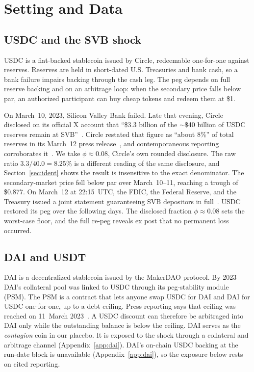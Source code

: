 \section{Setting and Data}
\label{sec:setting}

\subsection{USDC and the SVB shock}
USDC is a fiat-backed stablecoin issued by Circle, redeemable one-for-one against
reserves. Reserves are held in short-dated U.S. Treasuries and bank cash, so a bank
failure impairs backing through the cash leg. The peg depends on full reserve backing and on an
arbitrage loop: when the secondary price falls below par, an authorized participant can
buy cheap tokens and redeem them at \$1.

On March~10, 2023, Silicon Valley Bank failed. Late that evening, Circle disclosed on its
official X account that ``\$3.3 billion of the ${\sim}$\$40 billion of USDC reserves remain
at SVB''~\cite{circle2023tweet}. Circle restated that figure as ``about $8\%$'' of total
reserves in its March~12 press release~\cite{circle2023pressrelease}, and contemporaneous
reporting corroborates it~\cite{capoot2023}. We take $\phi\approx 0.08$, Circle's own
rounded disclosure. The raw ratio $3.3/40.0=8.25\%$ is a different reading of the same
disclosure, and Section~\ref{sec:ident} shows the result is insensitive to the exact
denominator. The secondary-market price fell below par over March~10--11, reaching a
trough of \$0.877. On March~12 at 22:15~UTC, the FDIC, the Federal Reserve, and the
Treasury issued a joint statement guaranteeing SVB depositors in full~\cite{fedtreasfdic2023pressrelease}.
USDC restored its peg over the following days. The disclosed fraction $\phi\approx 0.08$
sets the worst-case floor, and the full re-peg reveals ex post that no
permanent loss occurred.

\subsection{DAI and USDT}
DAI is a decentralized stablecoin issued by the MakerDAO protocol. By 2023 DAI's collateral
pool was linked to USDC through its peg-stability module (PSM). The PSM is a contract
that lets anyone swap USDC for DAI and DAI for USDC one-for-one, up to a debt ceiling. Press
reporting says that ceiling was reached on 11~March 2023~\cite{theblock2023psm}. A USDC discount can therefore be
arbitraged into DAI only while the outstanding balance is below the ceiling. DAI serves
as the \emph{contagion} coin in our placebo. It is exposed to the shock through a collateral
and arbitrage channel (Appendix~\ref{app:dai}). DAI's on-chain USDC backing at the run-date
block is unavailable (Appendix~\ref{app:dai}), so the exposure below rests on cited
reporting.

